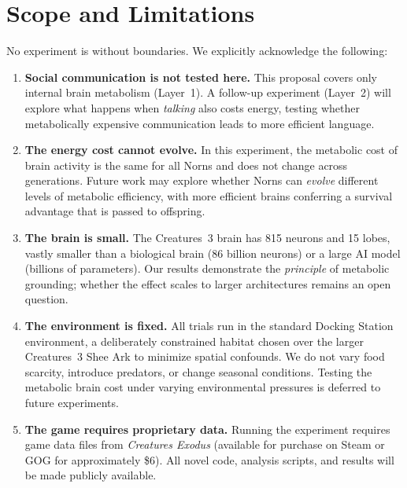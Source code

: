 \documentclass[12pt, a4paper]{article}
\begin{document}
\section{Scope and Limitations}
\label{sec:limitations}

No experiment is without boundaries. We explicitly acknowledge the following:

\begin{enumerate}[label=(\alph*)]
  \item \textbf{Social communication is not tested here.} This proposal covers only internal brain metabolism (Layer~1). A follow-up experiment (Layer~2) will explore what happens when \emph{talking} also costs energy, testing whether metabolically expensive communication leads to more efficient language.

  \item \textbf{The energy cost cannot evolve.} In this experiment, the metabolic cost of brain activity is the same for all Norns and does not change across generations. Future work may explore whether Norns can \emph{evolve} different levels of metabolic efficiency, with more efficient brains conferring a survival advantage that is passed to offspring.

  \item \textbf{The brain is small.} The Creatures~3 brain has 815 neurons and 15 lobes, vastly smaller than a biological brain (86 billion neurons) or a large AI model (billions of parameters). Our results demonstrate the \emph{principle} of metabolic grounding; whether the effect scales to larger architectures remains an open question.

  \item \textbf{The environment is fixed.} All trials run in the standard Docking Station environment, a deliberately constrained habitat chosen over the larger Creatures~3 Shee Ark to minimize spatial confounds. We do not vary food scarcity, introduce predators, or change seasonal conditions. Testing the metabolic brain cost under varying environmental pressures is deferred to future experiments.

  \item \textbf{The game requires proprietary data.} Running the experiment requires game data files from \textit{Creatures Exodus} (available for purchase on Steam or GOG for approximately \$6). All novel code, analysis scripts, and results will be made publicly available.
\end{enumerate}
\end{document}
